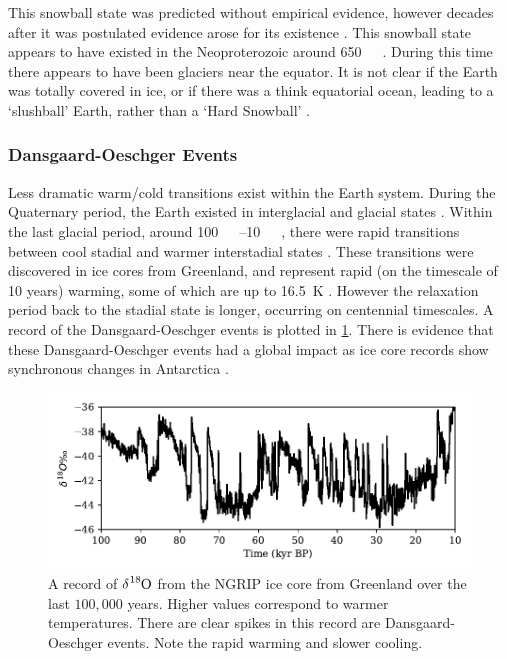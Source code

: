 This snowball state was predicted without empirical evidence, however decades after it was postulated evidence arose for its existence \parencite{Kirschvink1992,Hoffman2002}.
This snowball state appears to have existed in the Neoproterozoic around \SI{650}{\mega\year\beforepresent}.
During this time there appears to have been glaciers near the equator. It is not clear
if the Earth was totally covered in ice, or if there was a think equatorial ocean, leading to a `slushball' Earth, rather than a `Hard Snowball' \parencite{Pierrehumbert2005,Pierrehumbert2011}.

\subsubsection{Dansgaard-Oeschger Events}
Less dramatic warm/cold transitions exist within the Earth system. During the Quaternary period, the Earth existed in interglacial and glacial states \parencite{Lisiecki2005}. Within the last glacial period,
around \SIrange{100}{10}{\kilo\year\beforepresent}, there were rapid transitions between cool stadial and warmer interstadial states \parencite{Oeschger1984,Dansgaard1993}. These transitions were discovered
in ice cores from Greenland, and represent rapid (on the timescale of 10 years) warming, some of which are up to \SI{16.5}{\kelvin} \parencite{Kindler2014}. However the relaxation period
back to the stadial state is longer, occurring on centennial timescales. A record of the Dansgaard-Oeschger events is plotted in \cref{fig:ngrip}. There is evidence that these Dansgaard-Oeschger events
had a global impact as ice core records show synchronous changes in Antarctica \parencite{Buizert2015}.

\begin{figure}
  \centering
  \includegraphics{ngrip}
  \caption[NGRIP record of Dansgaard Oeschger events]{A record of $\delta \ce{^{18}O}$ from the NGRIP ice core from Greenland \parencite{NGRIP2004} over the last $100,000$ years.
    Higher values correspond to warmer temperatures. There are clear spikes in this record are Dansgaard-Oeschger events. Note the rapid warming and slower cooling.}
  \label{fig:ngrip}
\end{figure}

